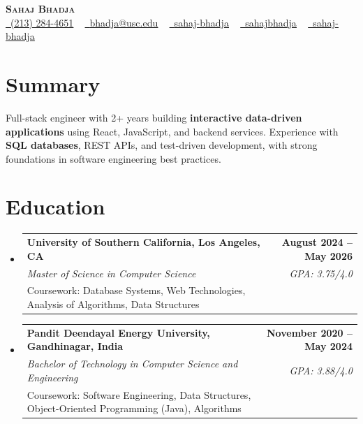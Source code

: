 \documentclass[letterpaper,10pt]{article}
\makeatletter
\newcommand{\resumeEduSubheading}[5]{\vspace{-1pt}\item\begin{tabular*}{1.0\textwidth}[t]{l@{\extracolsep{\fill}}r}\textbf{#1} & \textbf{\small #2} \\\textit{\small #3} & \textit{\small #4} \\\small #5 & \\\end{tabular*}\vspace{-4pt}}
\newcommand{\resumeSubHeadingListStart}{\begin{itemize}[leftmargin=0.0in, label={}]}
\newcommand{\resumeSubHeadingListEnd}{\end{itemize}}
\makeatother
\begin{document}
\begin{center}
{\Huge \scshape \textbf{Sahaj Bhadja}} \\ \vspace{1pt}
\small \href{tel:(213) 284-4651}{\faPhone\ \underline{(213) 284-4651}} ~ \href{mailto:bhadja@usc.edu}{\raisebox{-0.2\height}\faEnvelope\ \underline{bhadja@usc.edu}} ~
\href{https://www.linkedin.com/in/sahaj-bhadja/}{\raisebox{-0.2\height}\faLinkedin\ \underline{sahaj-bhadja}} ~ \href{https://github.com/SAHAJ-BHADJA}{\raisebox{-0.2\height}\faGithub\ \underline{sahajbhadja}} ~
\href{https://sahaj-bhadja.vercel.app/}{\raisebox{-0.2\height}\faGlobe\ \underline{sahaj-bhadja}}
\end{center}
\vspace{-18pt}
\section{Summary}
\begin{itemize}[leftmargin=0.15in, label={}]
\small{\item{Full-stack engineer with 2+ years building \textbf{interactive data-driven applications} using React, JavaScript, and backend services. Experience with \textbf{SQL databases}, REST APIs, and test-driven development, with strong foundations in software engineering best practices.}}
\end{itemize}
\vspace{-16pt}
\section{Education}
\resumeSubHeadingListStart
\resumeEduSubheading{University of Southern California, Los Angeles, CA}{August 2024 -- May 2026}{Master of Science in Computer Science}{GPA: 3.75/4.0}{Coursework: Database Systems, Web Technologies, Analysis of Algorithms, Data Structures}
\vspace{-9pt}
\resumeEduSubheading{Pandit Deendayal Energy University, Gandhinagar, India}{November 2020 -- May 2024}{Bachelor of Technology in Computer Science and Engineering}{GPA: 3.88/4.0}{Coursework: Software Engineering, Data Structures, Object-Oriented Programming (Java), Algorithms}
\resumeSubHeadingListEnd
\vspace{-14pt}
\end{document}
